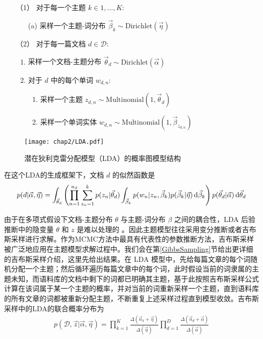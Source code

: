 \begin{enumerate}
    \item[（1）] 对于每一个主题 $k\in {1,\dots,K}$:
    \begin{itemize}
        \item[(a)] 采样一个主题-词分布 $\vec\beta_k\sim \mbox{Dirichlet}(\vec\eta)$ 
    \end{itemize}
	\item[（2）] 对于每一篇文档 $d \in \mathcal{D}$:
	    \begin{enumerate}
		    \item 采样一个文档-主题分布 $\vec\theta_d\sim \mbox{Dirichlet}(\vec\alpha)$
		    \item 对于 $d$ 中的每个单词 $w_{d,n}$:
		        \begin{enumerate}
			            \item 采样一个主题 $z_{d,n} \sim \mbox{Multinomial}(1,\vec\theta_d)$
			            \item 采样一个单词实体 $w_{d,n}\sim \mbox{Multinomial}(1,\vec\beta_{z_{d,n}})$
			        \end{enumerate}
		    \end{enumerate}
\end{enumerate}

\begin{figure}[ht]
    \centering
        \texttt{[image: chap2/LDA.pdf]}
        \caption{潜在狄利克雷分配模型（LDA）的概率图模型结构} \label{lda}
\end{figure}

在这个LDA的生成框架下，文档 $d$ 的似然函数是
\begin{equation}
	\label{lda_like}
	p(d|\vec\alpha,\vec\eta)=\int_{\vec\theta_d}\left(\prod_{n=1}^{n_d}\sum_{z_n=1}^k p(z_n|\vec\theta_d)\int_{\vec\beta_k} p(w_n|z_n,\vec\beta_k)p(\vec\beta_k|\vec\eta)\mathop{}\!\mathrm{d}\vec\beta_k\right)p(\vec\theta_d|\vec\alpha)\mathop{}\!\mathrm{d}\vec\theta_d
\end{equation}

由于在多项式假设下文档-主题分布 $\theta$ 与主题-词分布 $\beta$ 之间的耦合性，LDA 后验推断中的隐变量 $\theta$ 和 $z$ 是难以处理的 \cite{AVITM}。因此主题模型往往采用变分推断\cite{VI}或者吉布斯采样\cite{Gibbs}进行求解。作为MCMC方法中最具有代表性的参数推断方法，吉布斯采样被广泛地应用在主题模型求解过程中。我们会在第\ref{GibbsSampling}节给出更详细的吉布斯采样介绍，这里先给出结果。在 LDA 模型中，先给每篇文章的每个词随机分配一个主题；然后循环遍历每篇文章中的每个词，此时假设当前的词隶属的主题未知，而语料库的文档中剩下的词都已明确其主题，基于此按照吉布斯采样公式计算在该词属于某一个主题的概率，并对当前的词重新采样一个主题，直到语料库的所有文章的词都被重新分配主题，不断重复上述采样过程直到模型收敛。吉布斯采样中的LDA的联合概率分布为
\begin{equation} 
	\begin{aligned}
	p(\mathcal{D},\vec{z} |\vec{\alpha},\vec{\eta}) = 
	\prod_{k=1}^K \frac{\Delta(\vec{n}_{k}+\vec{\eta})}{\Delta(\vec{\eta})}
	\prod_{d=1}^D  \frac{\Delta(\vec{n}_{d}+\vec{\alpha})}{\Delta(\vec{\alpha})}
	\end{aligned}
\label{joinProbLDA2}
\end{equation}


